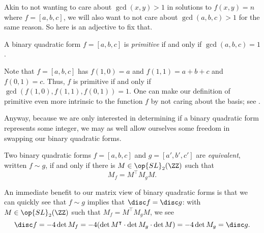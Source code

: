 \documentclass[../notes.tex]{subfiles}
\begin{document}
Akin to not wanting to care about $\gcd(x,y)>1$ in solutions to $f(x,y)=n$ where $f=[a,b,c]$, we will also want to not care about $\gcd(a,b,c)>1$ for the same reason. So here is an adjective to fix that.
\begin{definition}[primitive]
	A binary quadratic form $f=[a,b,c]$ is \textit{primitive} if and only if $\gcd(a,b,c)=1$.
\end{definition}
\begin{remark} \label{rem:intrinisic-primitive}
	Note that $f=[a,b,c]$ has $f(1,0)=a$ and $f(1,1)=a+b+c$ and $f(0,1)=c$. Thus, $f$ is primitive if and only if $\gcd(f(1,0),f(1,1),f(0,1))=1$. One can make our definition of primitive even more intrinsic to the function $f$ by not caring about the basis; see .
\end{remark}
Anyway, because we are only interested in determining if a binary quadratic form represents some integer, we may as well allow ourselves some freedom in swapping our binary quadratic forms.
\begin{definition}[equivalent]
	Two binary quadratic forms $f=[a,b,c]$ and $g=[a',b',c']$ are \textit{equivalent}, written $f\sim g$, if and only if there is $M\in\op{SL}_2(\ZZ)$ such that
	\[M_f=M^\intercal M_gM.\]
\end{definition}
\begin{remark}
	An immediate benefit to our matrix view of binary quadratic forms is that we can quickly see that $f\sim g$ implies that $\disc f=\disc g$: with $M\in\op{SL}_2(\ZZ)$ such that $M_f=M^\intercal M_gM$, we see
	\[\disc f=-4\det M_f=-4(\det M^\intercal\cdot\det M_g\cdot\det M)=-4\det M_g=\disc g.\]
\end{remark}
\end{document}
